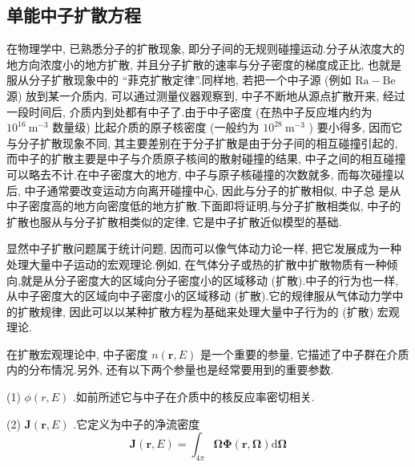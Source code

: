 \documentclass{Sichuan Normal University}
\begin{document}

\subsection{单能中子扩散方程}
在物理学中, 已熟悉分子的扩散现象, 即分子间的无规则碰撞运动.分子从浓度大的地方向浓度小的地方扩散, 并且分子扩散的速率与分子密度的梯度成正比, 也就是服从分子扩散现象中的 “菲克扩散定律”.同样地, 若把一个中子源 (例如 $\mathrm{Ra}-\mathrm{Be}$ 源) 放到某一介质内, 可以通过测量仪器观察到, 中子不断地从源点扩散开来, 经过一段时间后, 介质内到处都有中子了.由于中子密度 (在热中子反应堆内约为 $10^{16} \mathrm{~m}^{-3}$ 数量级) 比起介质的原子核密度 (一般约为 $10^{28} \mathrm{~m}^{-3}$ ) 要小得多, 因而它与分子扩散现象不同, 其主要差别在于分子扩散是由于分子间的相互碰撞引起的, 而中子的扩散主要是中子与介质原子核间的散射碰撞的结果, 中子之间的相互碰撞可以略去不计.在中子密度大的地方, 中子与原子核碰撞的次数就多, 而每次碰撞以后, 中子通常要改变运动方向离开碰撞中心, 因此与分子的扩散相似, 中子总
是从中子密度高的地方向密度低的地方扩散.下面即将证明,与分子扩散相类似, 中子的扩散也服从与分子扩散相类似的定律, 它是中子扩散近似模型的基础.

显然中子扩散问题属于统计问题, 因而可以像气体动力论一样, 把它发展成为一种处理大量中子运动的宏观理论.例如, 在气体分子或热的扩散中扩散物质有一种倾向,就是从分子密度大的区域向分子密度小的区域移动 (扩散).中子的行为也一样, 从中子密度大的区域向中子密度小的区域移动 (扩散).它的规律服从气体动力学中的扩散规律, 因此可以以某种扩散方程为基础来处理大量中子行为的 (扩散) 宏观理论.

在扩散宏观理论中, 中子密度 $n(\boldsymbol{r}, E)$ 是一个重要的参量, 它描述了中子群在介质内的分布情况.另外, 还有以下两个参量也是经常要用到的重要参数.

(1) $\phi(r, E)$ .如前所述它与中子在介质中的核反应率密切相关.

(2) $\boldsymbol{J}(\boldsymbol{r}, E)$ .它定义为中子的净流密度
\begin{equation}
    \boldsymbol{J}(\boldsymbol{r}, E)=\int_{4 \pi} \boldsymbol{\Omega} \boldsymbol{\Phi}(\boldsymbol{r}, \boldsymbol{\Omega}) \mathrm{d} \boldsymbol{\Omega}
    \label{eq:中子的净流密度}
\end{equation}
\end{document}
